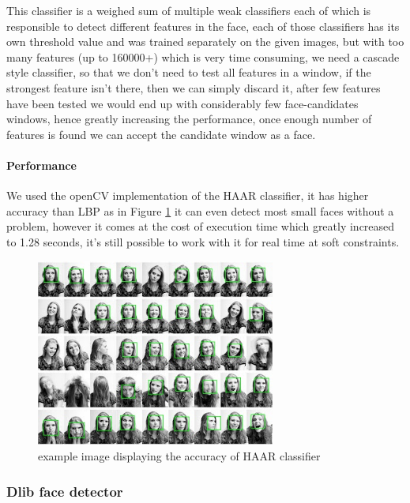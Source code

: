 This classifier is a weighed sum of multiple weak classifiers each of which is responsible to detect different features in the face, each of those classifiers has its own threshold value and was trained separately on the given images, 
but with too many features (up to 160000+) which is very time consuming, we need a cascade style classifier, so that we don't need to test all features in a window, if the strongest feature isn't there, then we can simply discard it, after few features have been tested we would end up with considerably few face-candidates windows, hence greatly increasing the performance, once enough number of features is found we can accept the candidate window as a face.

\paragraph{Performance}
We used the openCV implementation of the HAAR classifier, it has higher accuracy than LBP as in Figure \ref{fig:haar_example} it can even detect most small faces without a problem, however it comes at the cost of execution time which greatly increased to 1.28 seconds, it's still possible to work with it for real time at soft constraints.
\begin{figure}
	\centering
	\includegraphics[width=0.7\textwidth]{images/haar_example.jpg}
	\caption{example image displaying the accuracy of HAAR classifier}
	\label{fig:haar_example}
\end{figure}


\subsubsection{Dlib face detector}
